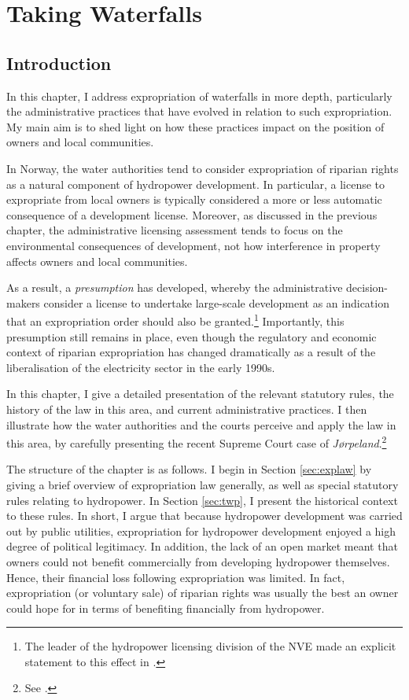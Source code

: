 \chapter{Taking Waterfalls}\label{chap:4}

\section{Introduction}\label{sec:intro4}

In this chapter, I address expropriation of waterfalls in more depth, particularly the administrative practices that have evolved in relation to such expropriation. My main aim is to shed light on how these practices impact on the position of owners and local communities.

In Norway, the water authorities tend to consider expropriation of riparian rights as a natural component of hydropower development. In particular, a license to expropriate from local owners is typically considered a more or less automatic consequence of a development license. Moreover, as discussed in the previous chapter, the administrative licensing assessment tends to focus on the environmental consequences of development, not how interference in property affects owners and local communities.

As a result, a {\it presumption} has
developed, whereby the administrative decision-makers consider a license to undertake large-scale development as an indication that an expropriation order should also be granted.\footnote{The leader of the hydropower licensing division of the NVE made an explicit statement to this effect in \cite{flatby08}.} Importantly, this presumption still remains in place, even though the regulatory and economic context of riparian expropriation has changed dramatically as a result of the liberalisation of the electricity sector in the early 1990s. 

In this chapter, I give a detailed presentation of the relevant statutory rules, the history of the law in this area, and current administrative practices. I then illustrate how the water authorities and the courts perceive and apply the law in this area, by carefully presenting the recent Supreme Court case of {\it Jørpeland}.\footnote{See \cite{jorpeland11}.}

The structure of the chapter is as follows. I begin in Section \ref{sec:explaw} by giving a brief overview of expropriation law generally, as well as special statutory rules relating to hydropower. In Section \ref{sec:twp}, I present the historical context to these rules. In short, I argue that because hydropower development was carried out by public utilities, expropriation for hydropower development enjoyed a high degree of political legitimacy. In addition, the lack of an open market meant that owners could not benefit commercially from developing hydropower themselves. Hence, their financial loss following expropriation was limited. In fact, expropriation (or voluntary sale) of riparian rights was usually the best an owner could hope for in terms of benefiting financially from hydropower.

